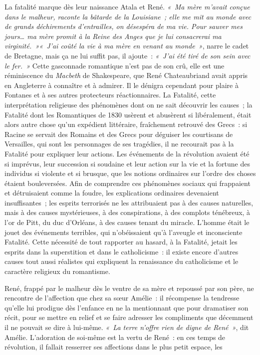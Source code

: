 \documentclass[french,twoside]{book} %
\begin{document}
\label{p592}La fatalité marque dès leur naissance Atala et René. \emph{« Ma mère m’avait conçue dans le malheur, raconte la bâtarde de la Louisiane ; elle me mit au monde avec de grands déchirements d’entrailles, on désespéra de ma vie. Pour sauver mes jours… ma mère promit à la Reine des Anges que je lui consacrerai ma virginité. »« J’ai coûté la vie à ma mère en venant au monde »}, narre le cadet de Bretagne, mais ça ne lui suffit pas, il ajoute : \emph{« J’ai été tiré de son sein avec le fer. »} Cette gasconnade romantique n’est pas de son crû, elle est une réminiscence du \emph{Macbeth} de Shakespeare, que René Chateaubriand avait appris en Angleterre à connaître et à admirer. Il le dénigra cependant pour plaire à Fontanes et à ses autres protecteurs réactionnaires. La Fatalité, cette interprétation religieuse des phénomènes dont on ne sait découvrir les causes ; la Fatalité dont les Romantiques de 1830 usèrent et abusèrent si libéralement, était alors autre chose qu’un expédient littéraire, fraîchement retrouvé des Grecs : si Racine se servait des Romains et des Grecs pour déguiser les courtisans de Versailles, qui sont les personnages de ses tragédies, il ne recourait pas à la Fatalité pour expliquer leur actions. Les événements de la révolution avaient été si imprévus, leur succession si soudaine et leur action sur la vie et la fortune des individus si violente et si brusque, que les notions ordinaires sur l’ordre des choses étaient bouleversées. Afin de comprendre ces phénomènes sociaux qui frappaient et détruisaient comme la foudre, les explications ordinaires devenaient insuffisantes ; les esprits terrorisés ne les attribuaient pas à des causes naturelles, mais à des causes mystérieuses, à des conspirations, à des complots ténébreux, à l’or de Pitt, du duc d’Orléans, à des causes tenant du miracle. L’homme était le jouet des événements terribles, qui n’obéissaient qu’à l’aveugle et inconsciente Fatalité. Cette nécessité de tout rapporter au hasard, à la Fatalité, jetait les esprits dans la superstition et dans le catholicisme : il existe encore d’autres causes tout aussi réalistes qui expliquent la renaissance du catholicisme et le caractère religieux du romantisme.\par
René, frappé par le malheur dès le ventre de sa mère et repoussé par son père, ne rencontre de l’affection que chez sa sœur Amélie : il récompense la tendresse qu’elle lui prodigue dès l’enfance en ne la mentionnant que pour dramatiser son récit, pour se mettre en relief et se faire adresser les compliments que décemment il ne pouvait se dire à lui-même. \emph{« La terre n’offre rien de digne de René »}, dit Amélie. L’adoration de soi-même est la vertu de René : en ces temps de révolution, il fallait resserrer ses affections dans le plus petit espace, les  
\end{document}
